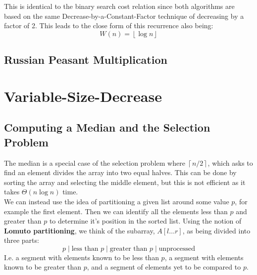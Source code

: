 \documentclass[12pt letter]{report}
\begin{document}
This is identical to the binary search cost relation since both algorithms are based on the same
Decrease-by-a-Constant-Factor technique of decreasing by a factor of 2. This leads to the close form of this recurrence
also being:
\[
  W \left( n \right)  = \left\lfloor \log n \right\rfloor
\]

\section{Russian Peasant Multiplication}


\chapter{Variable-Size-Decrease}
\section{Computing a Median and the Selection Problem}


The median is a special case of the selection problem where $\left\lceil n / 2 \right\rceil $, which asks to find an
element divides the array into two equal halves. This can be done by sorting the array and selecting the middle element,
but this is not efficient as it takes $\Theta \left( n \log n \right) $ time.\\
We can instead use the idea of partitioning a given list around some value $p$, for example the first element. Then we
can identify all the elements less than $p$ and greater than $p$ to determine it's position in the sorted list. Using
the notion of \textbf{Lomuto partitioning}, we think of the subarray, $A \left[ l \ldots r \right] $, as being divided into three parts:
\[
  p \mid \text{less than $p$} \mid \text{greater than $p$} \mid \text{unprocessed}
\]
I.e. a segment with elements known to be less than $p$, a segment with elements known to be greater than $p$, and a
segment of elements yet to be compared to $p$.
\end{document}
